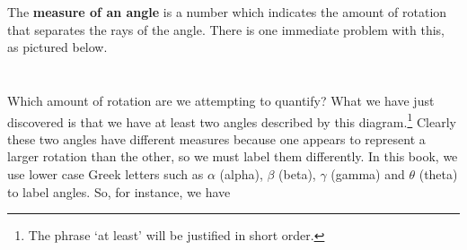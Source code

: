 \documentclass[12pt]{ximera}
\begin{document}
\[ \begin{array}{cc}

  

&

\hspace{1.75in}

   \\ \end{array} \]

The \textbf{measure of an angle} is a number which indicates the amount of rotation that separates the rays of the angle.  There is one immediate problem with this, as pictured below. 

\[ \begin{array}{cc}

  

& 

\hspace{2in}

 \\ \end{array} \]

Which amount of rotation are we attempting to quantify?  What we have just discovered is that we have at least two angles described by this diagram.\footnote{The phrase `at least' will be justified in short order.}  Clearly these two angles have different measures because one appears to represent a larger rotation than the other, so we must label them differently.  In this book, we use lower case Greek letters such as $\alpha$ (alpha),   $\beta$ (beta),  $\gamma$ (gamma) and $\theta$ (theta) to label angles.  So, for instance, we have
\end{document}
